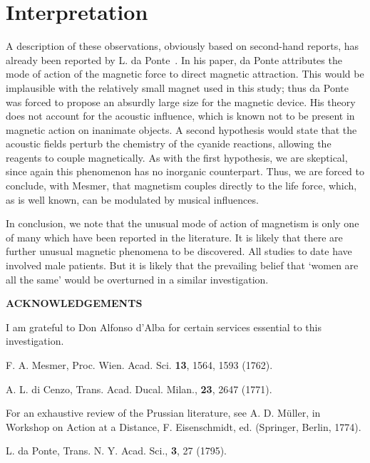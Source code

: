 \documentclass[12pt]{article}
\def\Acknowledgements{\bigskip  \bigskip \begin{center} \begin{large}
             \bf ACKNOWLEDGEMENTS \end{large}\end{center}}
\begin{document}
\section{Interpretation}

A description of these observations, obviously based on second-hand reports,
has already been reported by L. da Ponte~\cite{daPonte}. 
 In his paper,
da Ponte attributes the mode of action of the magnetic force to direct
magnetic attraction.  This would be implausible with the relatively small
magnet used in this study; thus da Ponte was forced to propose an absurdly
large size for the  magnetic device.  His theory does not account for the
acoustic influence, which is known not to be present in magnetic action on
inanimate objects.  A second hypothesis would state that the acoustic
fields perturb the chemistry of the cyanide reactions, allowing the 
reagents to couple magnetically.   As with the first hypothesis, we are
skeptical, since again this phenomenon has no inorganic counterpart.  Thus,
we are forced to conclude, with Mesmer, that magnetism couples directly to 
the life force, which, as is well known, can be modulated by musical 
influences.

In conclusion, we note that the unusual mode of action of magnetism is only
one of many which have been reported in the literature.  It is likely
that there are further unusual magnetic phenomena to be discovered.  All
studies to date have involved male patients.  But it is likely that the 
prevailing belief that `women are all the same' would be overturned in a
similar investigation.




\Acknowledgements
I am grateful to Don Alfonso d'Alba for certain services essential to 
this investigation.



\begin{thebibliography}{99}




F. A. Mesmer, Proc. Wien. Acad. Sci. {\bf 13}, 1564, 1593 (1762).

A. L. di Cenzo, Trans. Acad. Ducal.  Milan., {\bf 23}, 2647 (1771).

For an exhaustive review of the Prussian literature, see A. D. M\"uller,
in Workshop on Action at a Distance, F. Eisenschmidt, ed. (Springer,
Berlin, 1774).


L. da Ponte, Trans. N. Y. Acad. Sci., {\bf 3}, 27 (1795).


\end{thebibliography}

 
\end{document}

